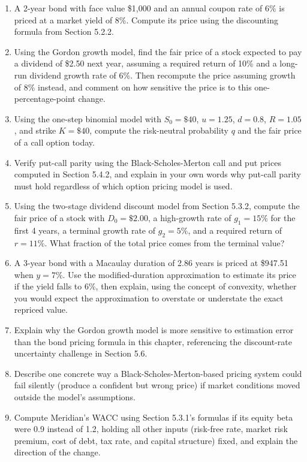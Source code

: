 \documentclass[../ai_in_finance]{subfiles}
\begin{document}
\begin{enumerate}
    \item A 2-year bond with face value \$1,000 and an annual coupon rate of 6\% is priced at a market yield of 8\%. Compute its price using the discounting formula from Section 5.2.2.
    \item Using the Gordon growth model, find the fair price of a stock expected to pay a dividend of \$2.50 next year, assuming a required return of 10\% and a long-run dividend growth rate of 6\%. Then recompute the price assuming growth of 8\% instead, and comment on how sensitive the price is to this one-percentage-point change.
    \item Using the one-step binomial model with $S_0 = \$40$, $u = 1.25$, $d = 0.8$, $R = 1.05$, and strike $K = \$40$, compute the risk-neutral probability $q$ and the fair price of a call option today.
    \item Verify put-call parity using the Black-Scholes-Merton call and put prices computed in Section 5.4.2, and explain in your own words why put-call parity must hold regardless of which option pricing model is used.
    \item Using the two-stage dividend discount model from Section 5.3.2, compute the fair price of a stock with $D_0=\$2.00$, a high-growth rate of $g_1=15\%$ for the first 4 years, a terminal growth rate of $g_2=5\%$, and a required return of $r=11\%$. What fraction of the total price comes from the terminal value?
    \item A 3-year bond with a Macaulay duration of 2.86 years is priced at \$947.51 when $y=7\%$. Use the modified-duration approximation to estimate its price if the yield falls to 6\%, then explain, using the concept of convexity, whether you would expect the approximation to overstate or understate the exact repriced value.
    \item Explain why the Gordon growth model is more sensitive to estimation error than the bond pricing formula in this chapter, referencing the discount-rate uncertainty challenge in Section 5.6.
    \item Describe one concrete way a Black-Scholes-Merton-based pricing system could fail silently (produce a confident but wrong price) if market conditions moved outside the model's assumptions.
    \item Compute Meridian's WACC using Section 5.3.1's formulas if its equity beta were 0.9 instead of 1.2, holding all other inputs (risk-free rate, market risk premium, cost of debt, tax rate, and capital structure) fixed, and explain the direction of the change.

\end{enumerate}
\end{document}
